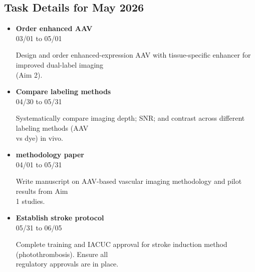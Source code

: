 \documentclass[landscape,a4paper]{article}
\begin{document}
\vspace{0.5cm}
\subsection{Task Details for May 2026}
\begin{itemize}[leftmargin=1cm, itemsep=0.8em]
    \item \textcolor{other}{\textbf{Order enhanced AAV}}\\[0.2em]
          \textcolor{black!70}{\small 03/01 to 05/01}
\\[0.3em]
          \begin{minipage}[t]{0.85\textwidth}
          \textcolor{black!80}{Design and order enhanced-expression AAV with tissue-specific enhancer for improved dual-label imaging\\[0.1em]
          (Aim 2).}
          \end{minipage}

    \item \textcolor{other}{\textbf{Compare labeling methods}}\\[0.2em]
          \textcolor{black!70}{\small 04/30 to 05/31}
\\[0.3em]
          \begin{minipage}[t]{0.85\textwidth}
          \textcolor{black!80}{Systematically compare imaging depth; SNR; and contrast across different labeling methods (AAV\\[0.1em]
          vs dye) in vivo.}
          \end{minipage}

    \item \textcolor{researchout}{\textbf{methodology paper}}\\[0.2em]
          \textcolor{black!70}{\small 04/01 to 05/31}
\\[0.3em]
          \begin{minipage}[t]{0.85\textwidth}
          \textcolor{black!80}{Write manuscript on AAV-based vascular imaging methodology and pilot results from Aim\\[0.1em]
          1 studies.}
          \end{minipage}

    \item \textcolor{other}{\textbf{Establish stroke protocol}}\\[0.2em]
          \textcolor{black!70}{\small 05/31 to 06/05}
\\[0.3em]
          \begin{minipage}[t]{0.85\textwidth}
          \textcolor{black!80}{Complete training and IACUC approval for stroke induction method (photothrombosis). Ensure all\\[0.1em]
          regulatory approvals are in place.}
          \end{minipage}

\end{itemize}
\end{document}
